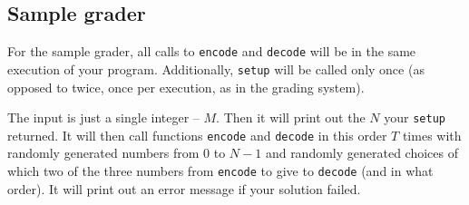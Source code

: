 \documentclass[12pt]{article}
\begin{document}
\subsection{Sample grader}

For the sample grader, all calls to \texttt{encode} and \texttt{decode} will be in the same execution of your program. Additionally, \texttt{setup} will be called only once (as opposed to twice, once per execution, as in the grading system).

The input is just a single integer -- $M$. Then it will print out the $N$ your \texttt{setup} returned. It will then call functions \texttt{encode} and \texttt{decode} in this order $T$ times with randomly generated numbers from $0$ to $N-1$ and randomly generated choices of which two of the three numbers from \texttt{encode} to give to \texttt{decode} (and in what order). It will print out an error message if your solution failed.
\end{document}
